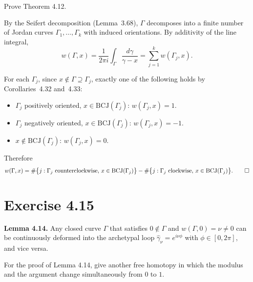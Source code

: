 \documentclass{article}
\begin{document}
Prove Theorem 4.12.

\begin{solution}
  By the Seifert decomposition (Lemma~3.68), $\Gamma$ decomposes into
  a finite number of Jordan curves $\Gamma_1, \ldots, \Gamma_k$
  with induced orientations.
  By additivity of the line integral,
  \[
    w(\Gamma, x)
    = \frac{1}{2\pi i}\int_\Gamma \frac{d\gamma}{\gamma - x}
    = \sum_{j=1}^{k} w(\Gamma_j, x).
  \]

  For each $\Gamma_j$, since $x \notin \Gamma \supseteq \Gamma_j$,
  exactly one of the following holds by Corollaries~4.32 and~4.33:
  \begin{itemize}
    \item $\Gamma_j$ positively oriented, $x \in \mathrm{BCJ}(\Gamma_j)$:
      $w(\Gamma_j, x) = 1$.
    \item $\Gamma_j$ negatively oriented, $x \in \mathrm{BCJ}(\Gamma_j)$:
      $w(\Gamma_j, x) = -1$.
    \item $x \notin \mathrm{BCJ}(\Gamma_j)$:
      $w(\Gamma_j, x) = 0$.
  \end{itemize}
  Therefore
  \[
    w(\Gamma, x)
    = \#\bigl\{j : \text{$\Gamma_j$ counterclockwise, }
      x \in \mathrm{BCJ}(\Gamma_j)\bigr\}
    - \#\bigl\{j : \text{$\Gamma_j$ clockwise, }
      x \in \mathrm{BCJ}(\Gamma_j)\bigr\}.\qedhere
  \]
\end{solution}

\section{Exercise 4.15}

\textbf{Lemma 4.14.}
Any closed curve $\Gamma$ that satisfies $0 \notin \Gamma$ and
$w(\Gamma, 0) = \nu \ne 0$ can be continuously deformed into the
archetypal loop $\hat{\gamma}_\nu = e^{i\nu\phi}$ with
$\phi \in [0, 2\pi]$, and vice versa.

For the proof of Lemma 4.14, give another free homotopy in which the
modulus and the argument change simultaneously from $0$ to $1$.
\end{document}
